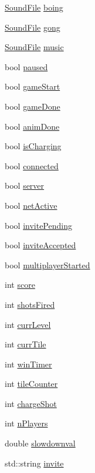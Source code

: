 \begin{DoxyCompactItemize}
\item 
\hyperlink{SoundManager_8h_a05cf79926d9921eb07e70e460b021307}{Sound\-File} \hyperlink{classTileGame_a796c40847db5cd687417574064fbd90d}{boing}
\item 
\hyperlink{SoundManager_8h_a05cf79926d9921eb07e70e460b021307}{Sound\-File} \hyperlink{classTileGame_a6912a91d6b7eb2e88033d8571e3daecb}{gong}
\item 
\hyperlink{SoundManager_8h_a05cf79926d9921eb07e70e460b021307}{Sound\-File} \hyperlink{classTileGame_a6622c980107331b95697d74839dde768}{music}
\item 
bool \hyperlink{classTileGame_ac76eb85a5597f84146e49c92f7edc877}{paused}
\item 
bool \hyperlink{classTileGame_a276db8a3e88eea0914e6f6262791ee89}{game\-Start}
\item 
bool \hyperlink{classTileGame_a8fb8cd476fcf067cdfe0495fbf9f417e}{game\-Done}
\item 
bool \hyperlink{classTileGame_abdd2197b16e59e2035984882aaebf9e3}{anim\-Done}
\item 
bool \hyperlink{classTileGame_ac1c6b430452c30f0c546ac15918b765f}{is\-Charging}
\item 
bool \hyperlink{classTileGame_aa5b3986f4fdfaefddd5a85b796be3a36}{connected}
\item 
bool \hyperlink{classTileGame_a8f1f5171595cb9819f47ad2c9849e810}{server}
\item 
bool \hyperlink{classTileGame_a475333f8fc083d4ea2fea31506834382}{net\-Active}
\item 
bool \hyperlink{classTileGame_ae23eafd71c3ecbccded93d7776c21445}{invite\-Pending}
\item 
bool \hyperlink{classTileGame_abeb262bc462d088865945f3bb4bff513}{invite\-Accepted}
\item 
bool \hyperlink{classTileGame_a94c15c528caf27fa578ddbfafd0e5a7f}{multiplayer\-Started}
\item 
int \hyperlink{classTileGame_abba0100f7c52d2a9ae1bfa0f5bbee4a5}{score}
\item 
int \hyperlink{classTileGame_a23df8d17a61584279dbec39ef31092cc}{shots\-Fired}
\item 
int \hyperlink{classTileGame_ade2ff1b55b30e055c67907574805c711}{curr\-Level}
\item 
int \hyperlink{classTileGame_a95f339ca3fee081b681bc04ca4db4b69}{curr\-Tile}
\item 
int \hyperlink{classTileGame_a05d9bbf0aebd4822ed518804eeb899fa}{win\-Timer}
\item 
int \hyperlink{classTileGame_a0a94db2f1d3da7a330e415d48c18e763}{tile\-Counter}
\item 
int \hyperlink{classTileGame_a1a8592c70c05bb2197c9b3cb0a33478e}{charge\-Shot}
\item 
int \hyperlink{classTileGame_a232f92064d80b722b022a3845be35b9e}{n\-Players}
\item 
double \hyperlink{classTileGame_a8b95ee0f509c6e7b170f392d755d2e59}{slowdownval}
\item 
std\-::string \hyperlink{classTileGame_a2aeaa1575631d37600e5c66bb2388a7b}{invite}
\end{DoxyCompactItemize}


